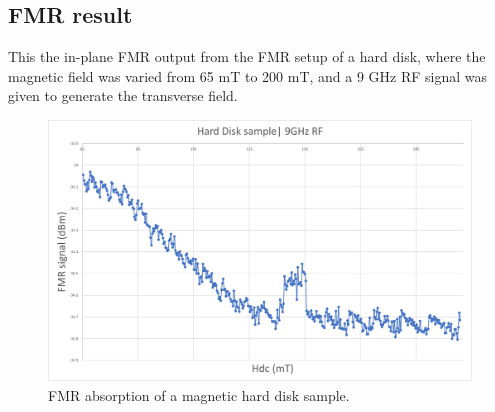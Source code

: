 \documentclass[12pt,a4paper,bold]{thesis}
\theoremstyle{thm}
\theoremstyle{definition}
\begin{document}
\subsection{FMR result}
This the in-plane FMR output from the FMR setup of a hard disk, where the magnetic field was varied from 65 mT to 200 mT, and a 9 GHz RF signal was given to generate the transverse field. 
\begin{figure}[H]
	\centering
   \includegraphics[scale=0.56]{Images/43.png} 
   \caption{FMR absorption of a magnetic hard disk sample.}
\end{figure}
\end{document}
